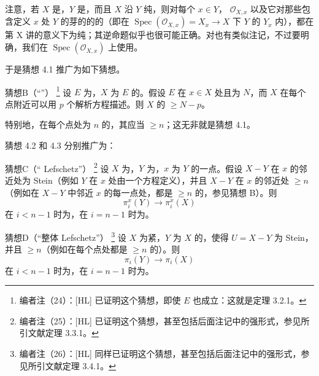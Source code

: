 注意，若 $X$ 是，$Y$ 是，而且 $X$ 沿 $Y$ 纯，则对每个 $x\in Y$， $\mathcal O_{X,x}$ 以及它对那些包含定义 $x$ 处 $Y$ 的芽的的的（即在 $\operatorname{Spec}(\mathcal O_{X,x})=X_x\to X$ 下 $Y$ 的 $Y_x$ 内），都在第 X 讲的意义下为纯；其逆命题似乎也很可能正确。对也有类似注记，不过要明确，我们在 $\operatorname{Spec}(\mathcal O_{X,x})$ 上使用。

于是猜想 4.1 推广为如下猜想。
\begin{SGAresult}{猜想}{B（“”）}
\footnote{编者注（24）：[HL] 已证明这个猜想，即使 $E$ 也成立：这就是定理 3.2.1。}
设 $E$ 为，$X$ 为 $E$ 的。假设 $E$ 在 $x\in X$ 处且为 $N$，而 $X$ 在每个点附近可以用 $p$ 个解析方程描述。则 $X$ 的 $\geq N-p$。
\end{SGAresult}
特别地，在每个点处为 $n$ 的，其应当 $\geq n$；这无非就是猜想 4.1。

猜想 4.2 和 4.3 分别推广为：
\begin{SGAresult}{猜想}{C（“ Lefschetz”）}
\footnote{编者注（25）：[HL] 已证明这个猜想，甚至包括后面注记中的强形式，参见所引文献定理 3.3.1。}
设 $X$ 为，$Y$ 为，$x$ 为 $Y$ 的一点。假设 $X-Y$ 在 $x$ 的邻近处为 Stein（例如 $Y$ 在 $x$ 处由一个方程定义），并且 $X-Y$ 在 $x$ 的邻近处 $\geq n$（例如在 $X-Y$ 中邻近 $x$ 的每一点处，都是 $\geq n$ 的，参见猜想 B）。则
\[
\pi_i^x(Y)\longrightarrow\pi_i^x(X)
\]
在 $i<n-1$ 时为，在 $i=n-1$ 时为。
\end{SGAresult}

\begin{SGAresult}{猜想}{D（“整体 Lefschetz”）}
\footnote{编者注（26）：[HL] 同样已证明这个猜想，甚至包括后面注记中的强形式，参见所引文献定理 3.4.1。}
设 $X$ 为紧，$Y$ 为 $X$ 的，使得 $U=X-Y$ 为 Stein，并且
$\geq n$（例如在每个点处都是 $\geq n$ 的）。则
\[
\pi_i(Y)\longrightarrow\pi_i(X)
\]
在 $i<n-1$ 时为，在 $i=n-1$ 时为。
\end{SGAresult}

